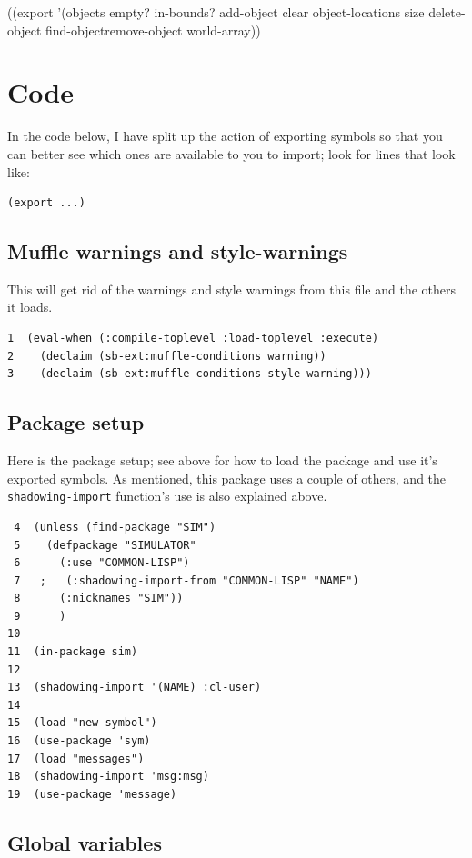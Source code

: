\documentclass[11pt]{tufte-handout}
\begin{document}
((export '(objects empty? in-bounds? add-object clear object-locations size delete-object find-objectremove-object world-array))


\section{Code}
\label{sec:org2de34f5}
\label{orge28bcd1}

In the code below, 
I have split up the action of exporting symbols so that you can better see which ones are available to you to import; look for lines that look like:
\begin{verbatim}
(export ...)
\end{verbatim}

\subsection{Muffle warnings and style-warnings}
\label{sec:org9c6593a}
This will get rid of the warnings and style warnings from this file and the others it loads.

\begin{verbatim}
1  (eval-when (:compile-toplevel :load-toplevel :execute)
2    (declaim (sb-ext:muffle-conditions warning))
3    (declaim (sb-ext:muffle-conditions style-warning)))
\end{verbatim}


\subsection{Package setup}
\label{sec:orga90ce01}

Here is the package setup; see above for how to load the package and use it's exported symbols.  As mentioned, this package uses a couple of others, and the \texttt{shadowing-import} function's use is also explained above.

\begin{verbatim}
 4  (unless (find-package "SIM")
 5    (defpackage "SIMULATOR"
 6      (:use "COMMON-LISP")
 7   ;   (:shadowing-import-from "COMMON-LISP" "NAME")
 8      (:nicknames "SIM"))
 9      )
10  
11  (in-package sim)
12  
13  (shadowing-import '(NAME) :cl-user)
14  
15  (load "new-symbol")
16  (use-package 'sym)
17  (load "messages")
18  (shadowing-import 'msg:msg)
19  (use-package 'message)
\end{verbatim}

\subsection{Global variables}
\label{sec:org6d5bad1}
\end{document}
